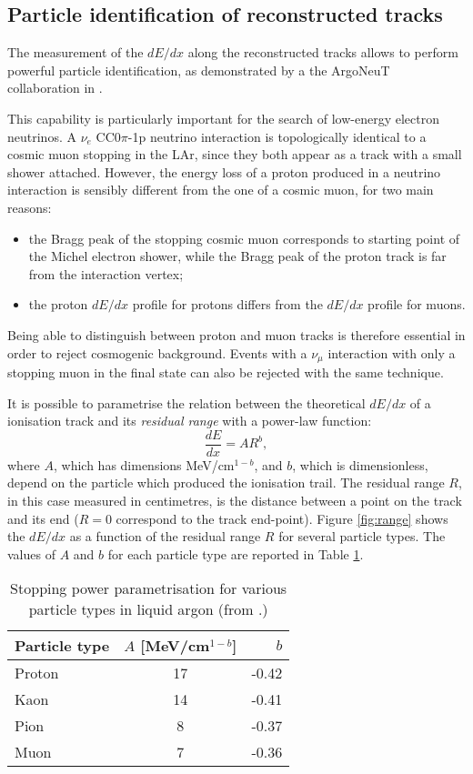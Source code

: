 \subsection{Particle identification of reconstructed tracks}\label{sec:proton_id}
The measurement of the $dE/dx$ along the reconstructed tracks allows to perform powerful particle identification, as demonstrated by a the ArgoNeuT collaboration in \cite{Acciarri:2013met}. 

This capability is particularly important for the search of low-energy electron neutrinos. A $\nu_e$ CC0$\pi$-1p neutrino interaction is topologically identical to a cosmic muon stopping in the LAr, since they both appear as a track with a small shower attached. However, the energy loss of a proton produced in a neutrino interaction is sensibly different from the one of a cosmic muon, for two main reasons:
\begin{itemize}
    \item the Bragg peak of the stopping cosmic muon corresponds to starting point of the Michel electron shower, while the Bragg peak of the proton track is far from the interaction vertex;
    \item the proton $dE/dx$ profile for protons differs from the $dE/dx$ profile for muons.
\end{itemize}
Being able to distinguish between proton and muon tracks is therefore essential in order to reject cosmogenic background. Events with a $\nu_{\mu}$ interaction with only a stopping muon in the final state can also be rejected with the same technique.

It is possible to parametrise the relation between the theoretical $dE/dx$ of a ionisation track and its \emph{residual range} with a power-law function:
\begin{equation}
    \frac{dE}{dx} = A R^b,
\end{equation}
where $A$, which has dimensions MeV/cm$^{1-b}$, and $b$, which is dimensionless, depend on the particle which produced the ionisation trail. The residual range $R$, in this case measured in centimetres, is the distance between a point on the track and its end ($R=0$ correspond to the track end-point).
Figure \ref{fig:range} shows the $dE/dx$ as a function of the residual range $R$ for several particle types. The values of $A$ and $b$ for each particle type are reported in Table \ref{tab:range}.

\begin{table}[htbp]
   \centering
   \caption{Stopping power parametrisation for various particle types in liquid argon (from \cite{Acciarri:2013met}.)}\label{tab:range}
   \begin{tabular}{lcr}
     \toprule
     Particle type & $A$ [MeV/cm$^{1-b}$] & $b$ \\
     \midrule
     Proton & 17 & -0.42 \\
     Kaon & 14 & -0.41 \\
     Pion & 8 & -0.37 \\
     Muon & 7 & -0.36 \\
     \bottomrule
   \end{tabular}
\end{table}

